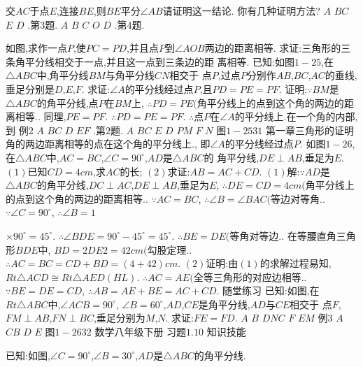 \documentclass[cn,blue,12pt]{elegantbook}
\begin{document}
\begin{liti}[resume]
交\( AC \)于点\( E\),连接\( BE\),则\( BE \)平分\( \angle  AB \)\task 请证明这一结论. 你有几种证明方法?
\(A\)
\(B C\)
\(E\)
\(D\)
.第\( 3 \)题.
\(A\)
\(B\)
\(C\)
\(O\)
\(D\)
.第\( 4 \)题.
\item 如图,求作一点\( P\),使\( PC = PD\),并且点\( P \)到\( \angle  AOB \)两边的距离相等. 
求证:三角形的三条角平分线相交于一点,并且这一点到三条边的距
离相等. 
已知:如图\( 1-25\),在\( \triangle ABC \)中,角平分线\( BM \)与角平分线\( CN \)相交于
点\( P\),过点\( P \)分别作\( AB\),\( BC\),\( AC \)的垂线,垂足分别是\( D\),\( E\),\( F\). 
求证:\( \angle  A \)的平分线经过点\( P\),且\( PD = PE = PF\). 
证明:\( \because BM \)是\( \triangle ABC \)的角平分线,点\( P \)在\( BM \)上,
\( \therefore PD = PE( \)角平分线上的点到这个角的两边的距
离相等.. 
同理,\( PE = PF\). 
\( \therefore PD = PE = PF\). 
\( \therefore \)点\( P \)在\( \angle  A \)的平分线上.在一个角的内部,到
例\(2\)
\(A\)
\(B C\)
\(D\)
\(E F\)
.第\( 2 \)题.
\(A\)
\(B C\)
\(E\)
\(D\)
\(P M\)
\(F\)
\(N\)
图\( 1-2531\)
第一章\(  \)三角形的证明
角的两边距离相等的点在这个角的平分线上.,
即\( \angle  A \)的平分线经过点\( P\). 
如图\( 1-26\),在\( \triangle ABC \)中,\( AC = BC\),\( \angle  C = 90 ^\circ \),\( AD \)是\( \triangle ABC \)的
角平分线,\( DE \perp AB\),垂足为\( E\). 
\(( 1) \)已知\( CD = 4 cm\),求\( AC \)的长;
\(( 2) \)求证:\( AB = AC + CD\). 
\(( 1) \)解:\( \because AD \)是\( \triangle ABC \)的角平分线,\( DC \perp AC\),\( DE \perp AB\),垂足为\( E\),
\( \therefore DE = CD = 4 cm( \)角平分线上的点到这个角的两边的距离相等.. 
\( \because AC = BC\),
\( \therefore \angle  B = \angle  BAC( \)等边对等角.. 
\( \because \angle  C = 90 ^\circ \),
\( \therefore \angle  B = 1\)
\item \( \times 90 ^\circ = 45 ^\circ \). 
\( \therefore \angle  BDE = 90 ^\circ - 45 ^\circ = 45 ^\circ \). 
\( \therefore BE = DE( \)等角对等边.. 
在等腰直角三角形\( BDE \)中,
\(BD = 2DE2 = 4 2 cm( \)勾股定理.. 
\( \therefore AC = BC = CD + BD =( 4 + 4 2) cm\). 
\(( 2) \)证明:由\(( 1) \)的求解过程易知,
\(Rt \triangle ACD \cong  Rt \triangle AED( HL) \). 
\( \therefore AC = AE( \)全等三角形的对应边相等.. 
\( \because BE = DE = CD\),
\( \therefore AB = AE + BE = AC + CD\). 
随堂练习
已知:如图,在\( R t \triangle A B C \)中,\( \angle  A C B = 9 0 ^\circ \),
\( \angle  B = 60 ^\circ \),\( AD\),\( CE \)是角平分线,\( AD \)与\( CE \)相交于
点\( F\),\( FM \perp AB\),\( FN \perp BC\),垂足分别为\( M\),\( N\). 
求证:\( FE = FD\). 
\(A\)
\(B\)
\(DN C\)
\(F\)
\(E M\)
例\(3\)
\(A\)
\(C B\)
\(D\)
\(E\)
图\( 1-2632\)
数学\(  \)八年级\(  \)下册
习题\( 1.10\)
知识技能
\item 已知:如图,\( \angle  C = 90 ^\circ \),\( \angle  B = 30 ^\circ \),\( AD \)是\( \triangle ABC \)的角平分线. 

\end{liti}
\end{document}
